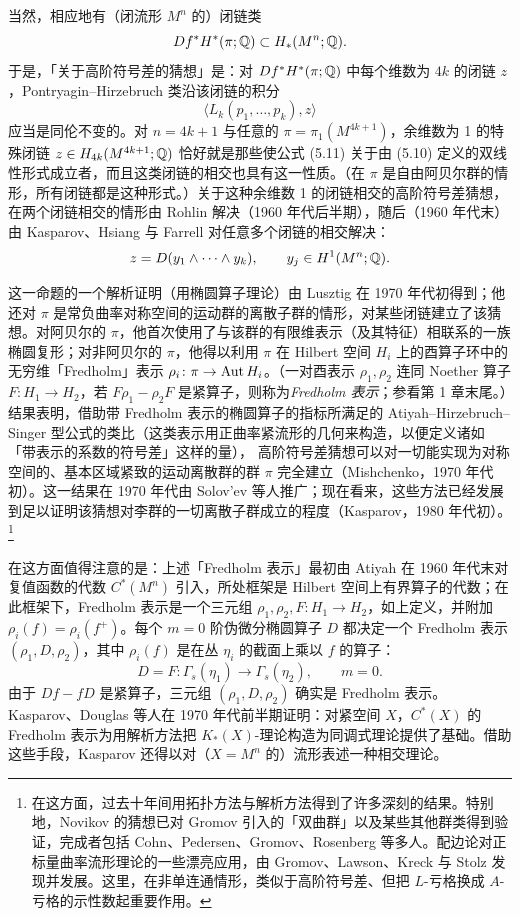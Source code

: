 当然，相应地有（闭流形 $M^{n}$ 的）闭链类
\[
Df^{*}H^{*}(\pi;\mathbb{Q})\subset H_{*}(M^{n};\mathbb{Q}).
\]
于是，「关于高阶符号差的猜想」是：对 $Df^{*}H^{*}(\pi;\mathbb{Q})$ 中每个维数为 $4k$ 的闭链 $z$，Pontryagin--Hirzebruch 类沿该闭链的积分
\[
\langle L_{k}(p_{1},\dots,p_{k}),z\rangle
\]
应当是同伦不变的。对 $n=4k+1$ 与任意的 $\pi=\pi_{1}(M^{4k+1})$，余维数为 1 的特殊闭链 $z\in H_{4k}(M^{4k+1};\mathbb{Q})$ 恰好就是那些使公式 (5.11) 关于由 (5.10) 定义的双线性形式成立者，而且这类闭链的相交也具有这一性质。（在 $\pi$ 是自由阿贝尔群的情形，所有闭链都是这种形式。）关于这种余维数 1 的闭链相交的高阶符号差猜想，在两个闭链相交的情形由 Rohlin 解决（1960 年代后半期），随后（1960 年代末）由 Kasparov、Hsiang 与 Farrell 对任意多个闭链的相交解决：
\[
z=D(y_{1}\wedge\dots\wedge y_{k}),\qquad y_{j}\in H^{1}(M^{n};\mathbb{Q}).
\]

这一命题的一个解析证明（用椭圆算子理论）由 Lusztig 在 1970 年代初得到；他还对 $\pi$ 是常负曲率对称空间的运动群的离散子群的情形，对某些闭链建立了该猜想。对阿贝尔的 $\pi$，他首次使用了与该群的有限维表示（及其特征）相联系的一族椭圆复形；对非阿贝尔的 $\pi$，他得以利用 $\pi$ 在 Hilbert 空间 $H_{i}$ 上的酉算子环中的无穷维「Fredholm」表示 $\rho_{i}\colon\pi\to\operatorname{Aut} H_{i}$。（一对酉表示 $\rho_{1},\rho_{2}$ 连同 Noether 算子 $F\colon H_{1}\to H_{2}$，若 $F\rho_{1}-\rho_{2}F$ 是紧算子，则称为\emph{Fredholm 表示}；参看第 1 章末尾。）结果表明，借助带 Fredholm 表示的椭圆算子的指标所满足的 Atiyah--Hirzebruch--Singer 型公式的类比（这类表示用正曲率紧流形的几何来构造，以便定义诸如「带表示的系数的符号差」这样的量），
高阶符号差猜想可以对一切能实现为对称空间的、基本区域紧致的运动离散群的群 $\pi$ 完全建立（Mishchenko，1970 年代初）。这一结果在 1970 年代由 Solov'ev 等人推广；现在看来，这些方法已经发展到足以证明该猜想对李群的一切离散子群成立的程度（Kasparov，1980 年代初）。\footnote{在这方面，过去十年间用拓扑方法与解析方法得到了许多深刻的结果。特别地，Novikov 的猜想已对 Gromov 引入的「双曲群」以及某些其他群类得到验证，完成者包括 Cohn、Pedersen、Gromov、Rosenberg 等多人。配边论对正标量曲率流形理论的一些漂亮应用，由 Gromov、Lawson、Kreck 与 Stolz 发现并发展。这里，在非单连通情形，类似于高阶符号差、但把 $L$-亏格换成 $A$-亏格的示性数起重要作用。}

在这方面值得注意的是：上述「Fredholm 表示」最初由 Atiyah 在 1960 年代末对复值函数的代数 $C^{*}(M^{n})$ 引入，所处框架是 Hilbert 空间上有界算子的代数；在此框架下，Fredholm 表示是一个三元组 $\rho_{1},\rho_{2},F\colon H_{1}\to H_{2}$，如上定义，并附加 $\rho_{i}(f)=\rho_{i}(f^{+})$。每个 $m=0$ 阶伪微分椭圆算子 $D$ 都决定一个 Fredholm 表示 $(\rho_{1},D,\rho_{2})$，其中 $\rho_{i}(f)$ 是在丛 $\eta_{i}$ 的截面上乘以 $f$ 的算子：
\[
D=F\colon\Gamma_{s}(\eta_{1})\to\Gamma_{s}(\eta_{2}),\qquad m=0.
\]
由于 $Df-fD$ 是紧算子，三元组 $(\rho_{1},D,\rho_{2})$ 确实是 Fredholm 表示。Kasparov、Douglas 等人在 1970 年代前半期证明：对紧空间 $X$，$C^{*}(X)$ 的 Fredholm 表示为用解析方法把 $K_{*}(X)$-理论构造为同调式理论提供了基础。借助这些手段，Kasparov 还得以对（$X=M^{n}$ 的）流形表述一种相交理论。


